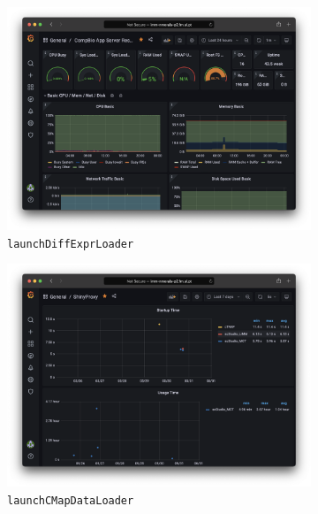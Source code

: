 \begin{figure}[!h]
	\centering
	\begin{subfigure}[h]{0.3\textwidth}
		\includegraphics[width=\textwidth]{images/app-server/grafana-system}
		\caption{\footnotesize{\texttt{launchDiffExprLoader}}}
	\end{subfigure}
	\begin{subfigure}[h]{0.3\textwidth}
		\includegraphics[width=\textwidth]{images/app-server/grafana-shinyproxy}
		\caption{\footnotesize{\texttt{launchCMapDataLoader}}}
	\end{subfigure}
	\begin{subfigure}[h]{0.3\textwidth}

\end{subfigure}
\end{figure}
